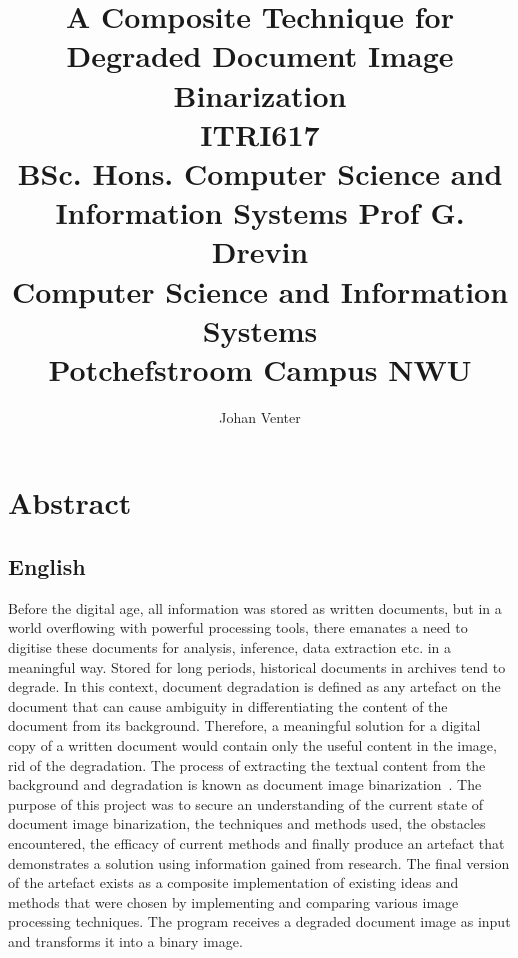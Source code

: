 \documentclass[a4paper, 12pt]{report}
\title{
    A Composite Technique for Degraded Document Image Binarization \\[12pt]
    \large
    ITRI617 \\[10pt]
    BSc. Hons. Computer Science and Information Systems
    Prof G. Drevin \\[10pt]
    Computer Science and Information Systems \\[10pt]
    Potchefstroom Campus NWU
}
\author{Johan Venter}
\begin{document}
\maketitle
\newpage

\tableofcontents
\newpage
\chapter{Abstract}
\section{English}
Before the digital age, all information was stored as written documents, but in a world overflowing with powerful processing tools, there emanates a need to digitise these documents for analysis, inference, data extraction etc. in a meaningful way. Stored for long periods, historical documents in archives tend to degrade. In this context, document degradation is defined as any artefact on the document that can cause ambiguity in differentiating the content of the document from its background. Therefore, a meaningful solution for a digital copy of a written document would contain only the useful content in the image, rid of the degradation. The process of extracting the textual content from the background and degradation is known as document image binarization~\cite{su2012robust}. The purpose of this project was to secure an understanding of the current state of document image binarization, the techniques and methods used, the obstacles encountered, the efficacy of current methods and finally produce an artefact that demonstrates a solution using information gained from research. The final version of the artefact exists as a composite implementation of existing ideas and methods that were chosen by implementing and comparing various image processing techniques. The program receives a degraded document image as input and transforms it into a binary image.
\end{document}
